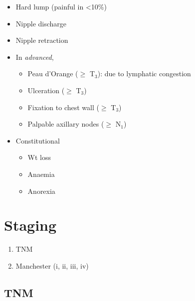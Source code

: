 \documentclass[
  12pt,
]{memoir}
\providecommand{\tightlist}{%
  \setlength{\itemsep}{0pt}\setlength{\parskip}{0pt}}
\begin{document}
\begin{itemize}
\tightlist
\item
  Hard lump (painful in \textless10\%)
\item
  Nipple discharge
\item
  Nipple retraction
\item
  In \emph{advanced},

  \begin{itemize}
  \tightlist
  \item
    Peau d'Orange (\(\ge\) T\(_3\)): due to lymphatic congestion
  \item
    Ulceration (\(\ge\) T\(_3\))
  \item
    Fixation to chest wall (\(\ge\) T\(_3\))
  \item
    Palpable axillary nodes (\(\ge\) N\(_1\))
  \end{itemize}
\item
  Constitutional

  \begin{itemize}
  \tightlist
  \item
    Wt loss
  \item
    Anaemia
  \item
    Anorexia
  \end{itemize}
\end{itemize}

\hypertarget{staging-1}{%
\section{Staging}\label{staging-1}}

\begin{enumerate}
\def\labelenumi{\arabic{enumi}.}
\tightlist
\item
  TNM
\item
  Manchester (i, ii, iii, iv)
\end{enumerate}

\hypertarget{tnm}{%
\subsection{TNM}\label{tnm}}
\end{document}
